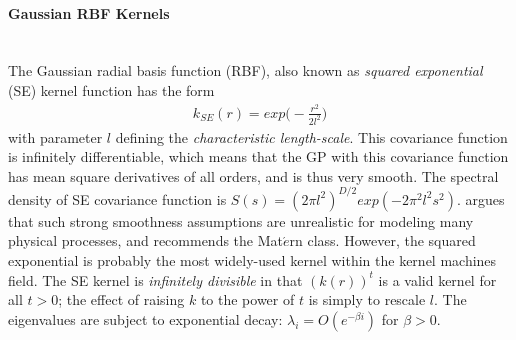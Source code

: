 \documentclass[11pt]{article}
\begin{document}
\paragraph{Gaussian RBF Kernels}\mbox{}\\
The Gaussian radial basis function (RBF), also known as \textsl{squared exponential} (SE) kernel function has the form
\begin{align*}
k_{SE}(r)=exp\Big(-\frac{r^2}{2l^2}\Big)
\end{align*}
with parameter $l$ defining the \textsl{characteristic length-scale}. This covariance function is infinitely differentiable, which means that the GP with this covariance function has mean square derivatives of all orders, and is thus very smooth. The spectral density of SE covariance function is $S(s)=(2\pi l^2)^{D/2}exp(-2\pi^2l^2s^2)$. \citep{stein_interpolation_1999} argues that such strong smoothness assumptions are unrealistic for modeling many physical processes, and recommends the Mat$\acute{e}$rn class. However, the squared exponential is probably the most widely-used kernel within the kernel machines field. The SE kernel is \textsl{infinitely divisible} in that $(k(r))^t$ is a valid kernel for all $t>0$; the effect of raising $k$ to the power of $t$ is simply to rescale $l$. The eigenvalues are subject to exponential decay: $\lambda_i=O(e^{-\beta i})$ for $\beta>0$.
\end{document}
